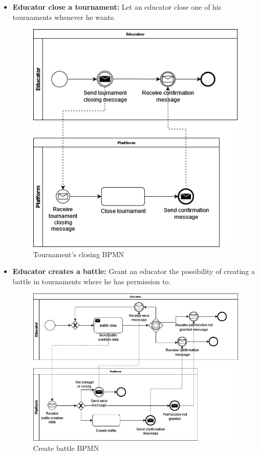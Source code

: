 \documentclass{article}
\begin{document}
{\begin{itemize}
    \item \textbf{Educator close a tournament:} Let an educator close one of his tournaments whenever he wants.
          \begin{figure}[H]
              \centering
              \includegraphics[scale=0.4]{images/BPMN/BPMN9.png}
              \caption{Tournament's closing BPMN}
              \label{fig:TournamentClosingBPMN}
          \end{figure}

    \item \textbf{Educator creates a battle:} Grant an educator the possibility of creating a battle in tournaments where he has permission to.
          \begin{figure}[H]
              \centering
              \includegraphics[scale=0.4]{images/BPMN/BPMN11.png}
              \caption{Create battle BPMN}
              \label{fig:createBattleBPMN}
          \end{figure}


\end{itemize}}
\end{document}
